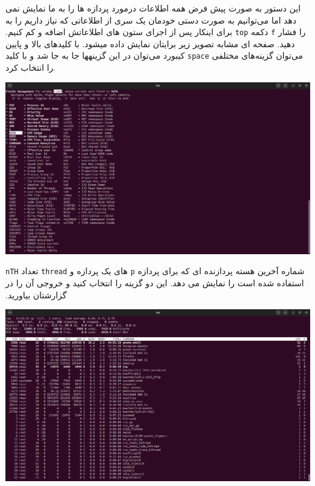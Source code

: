 ‫این‬‫ دستور‬ ‫به‬ ‫صورت‬ ‫پیش‬ ‫فرض‬ ‫همه‬ ‫اطلاعات درمورد‬ ‫پردازه‬ ‫ها‬ ‫را‬ ‫به‬ ‫ما‬ ‫نمایش‬ ‫نمی‬ ‫دهد‬‫ اما‬ ‫می‌توانیم‬ ‫به‬ ‫صورت‬ ‫دستی‬‫ خودمان‬ ‫یک‬ ‫سری‬ ‫از‬ ‫اطلاعاتی‬ ‫که‬ ‫نیاز‬ ‫داریم‬ ‫را‬ ‫به‬ ‫ستون‬ ‫های‬ ‫اطلاعاتش‬ ‫اضافه‬ ‫و‬ ‫کم‬ ‫کنیم‪.‬‬ ‫برای‬ ‫اینکار‬ ‫پس‬ از‬‫ اجرای‬ \texttt{top} دکمه \texttt{f} را فشار دهید. ‫صفحه‬ ‫ای‬ ‫مشابه‬ ‫تصویر‬ ‫زیر‬ ‫برایتان‬ ‫نمایش‬ ‫داده‬ ‫میشود‬. با کلید‌های ‫بالا ‬‫و‬ ‫پایین‬ ‫کیبورد‬ ‫می‌توان‬ ‫در‬ ‫این‬ ‫گزینه‬‫ها‬ ‫جا‬ ‫به‬ ‫جا‬ ‫شد‬ ‫و‬ ‫با‬ ‫کلید‬ \texttt{space} می‌توان گزینه‌های مختلفی را انتخاب کرد.
\begin{qsolve}
	\begin{center}
		\includegraphics[width=\textwidth]{pics/img2.png}
	\end{center}
\end{qsolve}

\texttt{nTH} تعداد \texttt{thread} های یک پردازه و \texttt{p} ‫شماره‬ ‫آخرین‬ ‫هسته‬ ‫پردازنده‬ ‫ای‬ ‫که‬ ‫برای‬ ‫پردازه‬ ‫استفاده‬ ‫شده‬ ‫است‬ ‫را‬
‫نمایش ‬‫می‬ ‫دهد‪.‬‬‫ این‬ ‫دو‬ ‫گزینه‬ ‫را‬ ‫انتخاب‬ ‫کنید‬ ‫و‬ ‫خروجی‬ ‫آن‬ ‫را‬ ‫در‬ ‫گزارشتان‬ ‫بیاورید‪.‬‬

\begin{qsolve}
	\begin{center}
		\includegraphics[width=\textwidth]{pics/img3.png}
	\end{center}
\end{qsolve}

